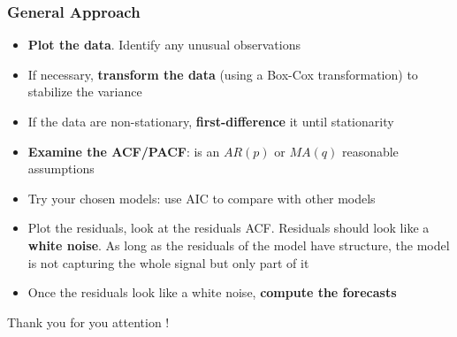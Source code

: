 \documentclass{beamer}
\begin{document}
\begin{frame}
  \frametitle{General Approach}
  \begin{itemize}
  \item \textbf{Plot the data}. Identify any unusual observations
  \item If necessary, \textbf{transform the data} (using a Box-Cox transformation) to stabilize the variance
  \item If the data are non-stationary, \textbf{first-difference} it until stationarity
  \item \textbf{Examine the ACF/PACF}: is an $AR(p)$ or $MA(q)$ reasonable assumptions
  \item Try your chosen models: use AIC to compare with other models
  \item Plot the residuals, look at the residuals ACF. Residuals should look like a \textbf{white noise}. As long as the residuals of the model have structure, the model is not capturing the whole signal but only part of it
  \item Once the residuals look like a white noise, \textbf{compute the forecasts}    
  \end{itemize}
\end{frame}

\begin{frame}
    \centering
    \Huge Thank you for you attention !
\end{frame}
\end{document}
